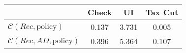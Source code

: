 \begin{tabular}{@{}lccc@{}} 
\toprule 
                          & Check      & UI    & Tax Cut    \\  \midrule 
$\mathcal{C}(Rec,\text{policy})$ & 0.137  & 3.731  & 0.005     \\ 
$\mathcal{C}(Rec, AD,\text{policy})$ & 0.396  & 5.364  & 0.107     \\ 
\end{tabular}  
